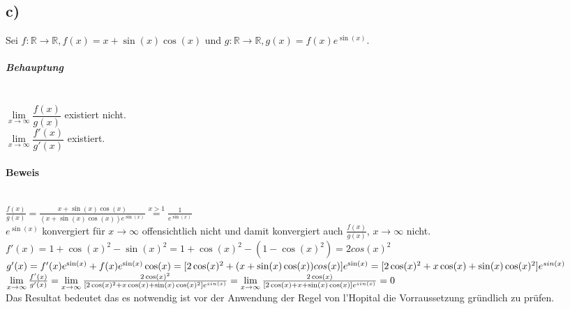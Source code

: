 \subsection*{c)}
Sei $ f:\mathbb{R} \to \mathbb{R},f(x) = x + \sin(x)\cos(x) $
und $ g:\mathbb{R} \to \mathbb{R},g(x) = f(x)e^{\sin(x)} $.

\subparagraph*{Behauptung} ~\\
\indent $\lim\limits_{x \to \infty} \dfrac{f(x)}{g(x)}$ existiert nicht. \\
\indent $\lim\limits_{x \to \infty} \dfrac{f'(x)}{g'(x)}$ existiert.

\paragraph*{Beweis} ~\\

$ \frac{f(x)}{g(x)} 
= \frac{x+\sin(x)\cos(x)}{(x+\sin(x)\cos(x))e^{\sin(x)}}
\overset{x > 1}{=} \frac{1}{e^{\sin(x)}}$ \\

$ e^{\sin(x)} $ konvergiert für $x \to \infty$ offensichtlich nicht und damit konvergiert auch $ \frac{f(x)}{g(x)} $, $ x \to \infty$ nicht. \\

$ f'(x) = 1 + \cos(x)^{2}-\sin(x)^{2} = 1 + \cos(x)^{2}-(1-\cos(x)^{2}) = 2 cos(x)^{2}$ \\

$ g'(x) = f'(x)e^{\sin(x)}+f(x)e^{\sin(x)}\cos(x) \\
= [2\cos(x)^{2} + (x + \sin(x)\cos(x))cos(x)]e^{\sin(x)} \\
= [2\cos(x)^{2} + x\cos(x) + \sin(x)\cos(x)^{2}]e^{sin(x)} $ \\

$ \lim\limits_{x \to \infty}\frac{f'(x)}{g'(x)} \\
= \lim\limits_{x \to \infty}\frac{2\cos(x)^{2}}{[2\cos(x)^{2} + x\cos(x) + \sin(x)\cos(x)^{2}]e^{sin(x)}} \\
= \lim\limits_{x \to \infty}\frac{2\cos(x)}{[2\cos(x) + x + \sin(x)\cos(x)]e^{sin(x)}}
 = 0$ \\

Das Resultat bedeutet das es notwendig ist vor der Anwendung der Regel von l'Hopital die Vorraussetzung gründlich zu prüfen.